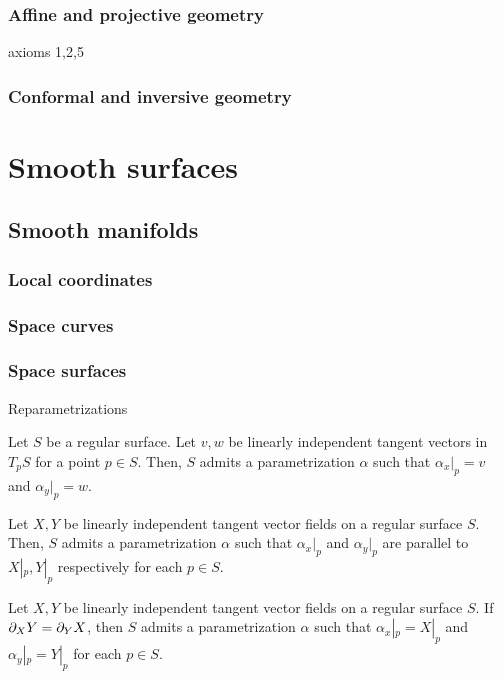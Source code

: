 \documentclass{../../large}
\begin{document}
\section{Affine and projective geometry}
axioms 1,2,5
\section{Conformal and inversive geometry}






\part{Smooth surfaces}
\chapter{Smooth manifolds}
\section{Local coordinates}

\section{Space curves}

\section{Space surfaces}



Reparametrizations

\begin{thm}
Let $S$ be a regular surface.
Let $v,w$ be linearly independent tangent vectors in $T_pS$ for a point $p\in S$.
Then, $S$ admits a parametrization $\alpha$ such that $\alpha_x|_p=v$ and $\alpha_y|_p=w$.
\end{thm}
\begin{thm}
Let $X,Y$ be linearly independent tangent vector fields on a regular surface $S$.
Then, $S$ admits a parametrization $\alpha$ such that $\alpha_x|_p$ and $\alpha_y|_p$ are parallel to $X|_p,Y|_p$ respectively for each $p\in S$.
\end{thm}
\begin{thm}
Let $X,Y$ be linearly independent tangent vector fields on a regular surface $S$.
If $\pd_XY=\pd_YX$, then $S$ admits a parametrization $\alpha$ such that $\alpha_x|_p=X|_p$ and $\alpha_y|_p=Y|_p$ for each $p\in S$.
\end{thm}
\end{document}
